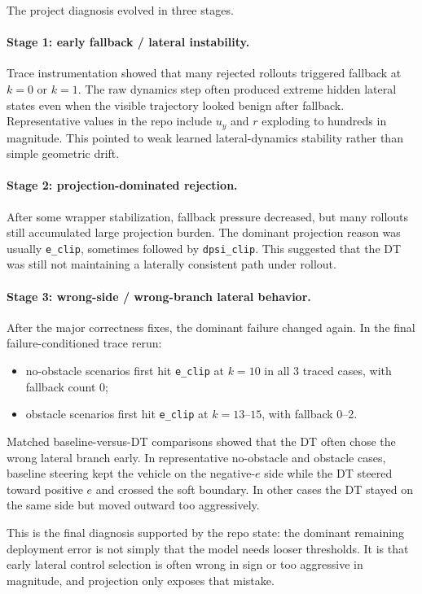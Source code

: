 The project diagnosis evolved in three stages.

\paragraph{Stage 1: early fallback / lateral instability.}
Trace instrumentation showed that many rejected rollouts triggered fallback at $k=0$ or $k=1$. The raw dynamics step often produced extreme hidden lateral states even when the visible trajectory looked benign after fallback. Representative values in the repo include $u_y$ and $r$ exploding to hundreds in magnitude. This pointed to weak learned lateral-dynamics stability rather than simple geometric drift.

\paragraph{Stage 2: projection-dominated rejection.}
After some wrapper stabilization, fallback pressure decreased, but many rollouts still accumulated large projection burden. The dominant projection reason was usually \texttt{e\_clip}, sometimes followed by \texttt{dpsi\_clip}. This suggested that the DT was still not maintaining a laterally consistent path under rollout.

\paragraph{Stage 3: wrong-side / wrong-branch lateral behavior.}
After the major correctness fixes, the dominant failure changed again. In the final failure-conditioned trace rerun:
\begin{itemize}
\item no-obstacle scenarios first hit \texttt{e\_clip} at $k=10$ in all 3 traced cases, with fallback count 0;
\item obstacle scenarios first hit \texttt{e\_clip} at $k=13$--$15$, with fallback 0--2.
\end{itemize}

Matched baseline-versus-DT comparisons showed that the DT often chose the wrong lateral branch early. In representative no-obstacle and obstacle cases, baseline steering kept the vehicle on the negative-$e$ side while the DT steered toward positive $e$ and crossed the soft boundary. In other cases the DT stayed on the same side but moved outward too aggressively.

This is the final diagnosis supported by the repo state: the dominant remaining deployment error is not simply that the model needs looser thresholds. It is that early lateral control selection is often wrong in sign or too aggressive in magnitude, and projection only exposes that mistake.
